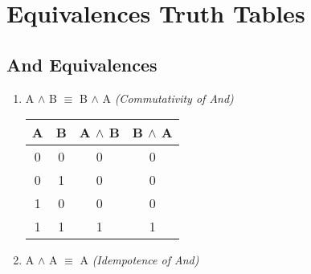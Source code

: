 \documentclass{report}
\begin{document}





\appendix

\chapter{Equivalences Truth Tables}

\section{And Equivalences}

\begin{enumerate}



  \item A $\land$ B $\equiv$ B $\land$ A \emph{(Commutativity of And)}



\begin{center}

  \begin{tabular}{| c | c | c | c |}

    \hline

    A & B & A $\land$ B & B $\land$ A \\ \hline

    0 & 0 & 0 & 0 \\

    0 & 1 & 0 & 0 \\

    1 & 0 & 0 & 0 \\

    1 & 1 & 1 & 1 \\ \hline

  \end{tabular}

\end{center}



  \item A $\land$ A $\equiv$ A \emph{(Idempotence of And)}



\begin{center}

  \begin{tabular}{| c | c |}


\end{tabular}
\end{center}
\end{enumerate}
\end{document}
